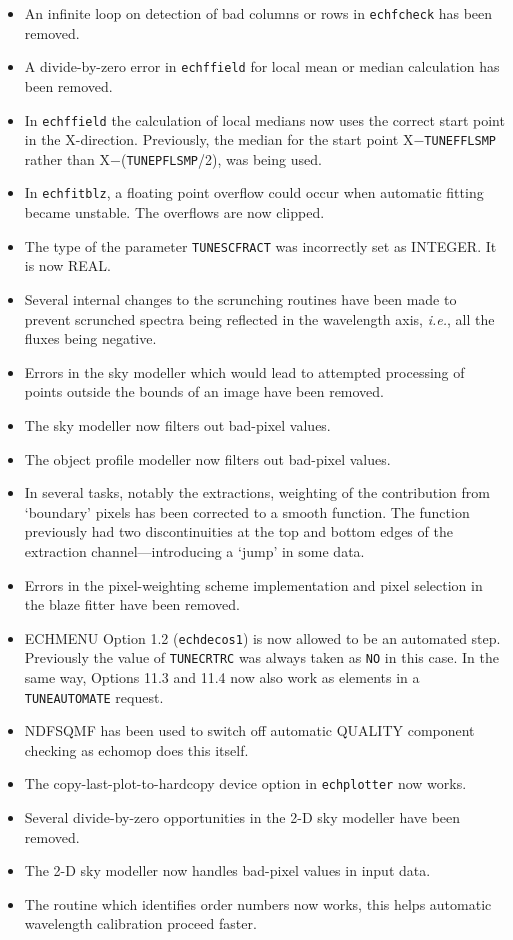 \documentclass[twoside,11pt]{article}
\newcommand{\htmlref}[2]{#1}
\renewcommand{\_}{\texttt{\symbol{95}}}
\newcommand{\sunspec}[2]{#1}
\newcommand{\sunspec}[2]{#2}
\begin{document}
\begin{itemize}
\item An infinite loop on detection of bad columns or rows in {\tt ech\_fcheck}
   has been removed.
\item A divide-by-zero error in {\tt ech\_ffield} for local mean or median
   calculation has been removed.
\item In {\tt ech\_ffield} the calculation of local medians now uses the correct
   start point in the X-direction.  Previously, the median for the start
   point X\sunspec{$-$}{-}{\tt{TUNE\_FFLSMP}} rather than
   X\sunspec{$-$}{-}({\tt{TUNE\_PFLSMP}}/2), was being used.
\item In {\tt ech\_fitblz}, a floating point overflow could occur when automatic
   fitting became unstable.  The overflows are now clipped.
\item The type of the parameter
   \htmlref{{\tt{TUNE\_SCFRACT}}}{par_TUNE_SCFRACT} was incorrectly set as
   \_INTEGER.  It is now \_REAL.
\item Several internal changes to the scrunching routines have been made to
   prevent scrunched spectra being reflected in the wavelength axis,
   {\it{i.e.}}, all the fluxes being negative.
\item Errors in the sky modeller which would lead to attempted processing
   of points outside the bounds of an image have been removed.
\item The sky modeller now filters out bad-pixel values.
\item The object profile modeller now filters out bad-pixel values.
\item In several tasks, notably the extractions, weighting of the
   contribution from `boundary' pixels has been corrected to a smooth
   function.  The function previously had two discontinuities at the top
   and bottom edges of the extraction channel---introducing a `jump' in
   some data.
\item Errors in the pixel-weighting scheme implementation and pixel
   selection in the blaze fitter have been removed.
\item ECHMENU Option 1.2 ({\tt{ech\_decos1}}) is now allowed to be an automated
   step. Previously the value of \htmlref{{\tt{TUNE\_CRTRC}}}{par_TUNE_CRTRC}
   was always taken as \texttt{NO} in
   this case.  In the same way, Options 11.3 and 11.4 now also work as
   elements in a {\tt TUNE\_AUTOMATE} request.
\item NDF\_SQMF has been used to switch off automatic QUALITY component
   checking as {\sc echomop} does this itself.
\item The copy-last-plot-to-hardcopy device option in {\tt ech\_plotter}
   now works.
\item Several divide-by-zero opportunities in the 2-D sky modeller have been
   removed.
\item The 2-D sky modeller now handles bad-pixel values in input data.
\item The routine which identifies order numbers now works, this helps
   automatic wavelength calibration proceed faster.
\end{itemize}
\end{document}
